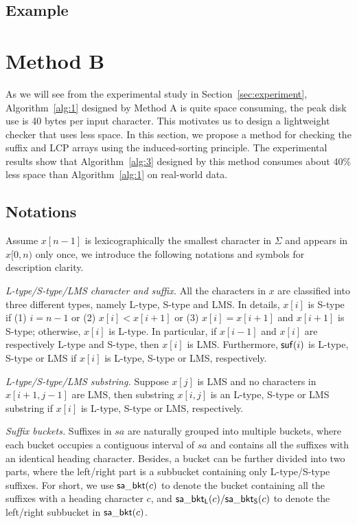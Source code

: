 \documentclass[10pt,journal,compsoc]{IEEEtran}
\begin{document}
	\subsection{Example} \label{sec:method1:example}
	
	
	\section{Method B} \label{sec:method2}
	
	As we will see from the experimental study in Section~\ref{sec:experiment}, Algorithm~\ref{alg:1} designed by Method A is quite space consuming, the peak disk use is 40 bytes per input character. This motivates us to design a lightweight checker that uses less space. In this section, we propose a method for checking the suffix and LCP arrays using the induced-sorting principle. The experimental results show that Algorithm~\ref{alg:3} designed by this method consumes about 40\% less space than Algorithm~\ref{alg:1} on real-world data.
	
	\subsection{Notations} \label{sec:algorithm2:notations}
	
	Assume $x[n - 1]$ is lexicographically the smallest character in $\Sigma$ and appears in $x[0, n)$ only once, we introduce the following notations and symbols for description clarity.
	
	{\em L-type/S-type/LMS character and suffix.} All the characters in $x$ are classified into three different types, namely L-type, S-type and LMS. In details, $x[i]$ is S-type if (1) $i = n - 1$ or (2) $x[i] < x[i + 1]$ or (3) $x[i] = x[i+1]$ and $x[i+1]$ is S-type; otherwise, $x[i]$ is L-type. In particular, if $x[i - 1]$ and $x[i]$ are respectively L-type and S-type, then $x[i]$ is LMS. Furthermore, ${\sf suf}(i)$ is L-type, S-type or LMS if $x[i]$ is L-type, S-type or LMS, respectively.
	
	{\em L-type/S-type/LMS substring.} Suppose $x[j]$ is LMS and no characters in $x[i + 1, j - 1]$ are LMS, then substring $x[i, j]$ is an L-type, S-type or LMS substring if $x[i]$ is L-type, S-type or LMS, respectively.
	
	{\em Suffix buckets.} Suffixes in $sa$ are naturally grouped into multiple buckets, where each bucket occupies a contiguous interval of $sa$ and contains all the suffixes with an identical heading character. Besides, a bucket can be further divided into two parts, where the left/right part is a subbucket containing only L-type/S-type suffixes. For short, we use ${\sf sa\_bkt}(c)$ to denote the bucket containing all the suffixes with a heading character $c$, and ${\sf sa\_bkt_L}(c)/{\sf sa\_bkt_S}(c)$ to denote the left/right subbucket in ${\sf sa\_bkt}(c)$.
	
\end{document}
